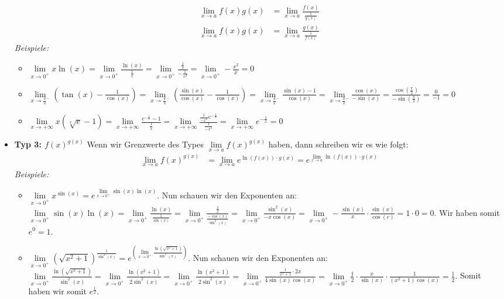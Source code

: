 \documentclass[25pt]{sciposter}
\newcommand{\limx}[1]{\lim\limits_{x \to #1}}
\begin{document}
\begin{multicols}{3}
\begin{itemize}
	\begin{align*}
	\lim_{x \to a}f(x) g(x) &= \lim_{x\to a} \frac{f(x)}{\frac{1}{g(x)}}\\
	\lim_{x \to a}f(x) g(x) &= \lim_{x\to a} \frac{g(x)}{\frac{1}{f(x)}}
	\end{align*}
	\textit{Beispiele:}
	\begin{itemize}
		\item $\limx{0^+} x\ln(x) = \limx{0^+} \frac{\ln(x)}{\frac{1}{x}} = \limx{0^+} \frac{\frac{1}{x}}{-\frac{1}{x^2}} = \limx{0^+} -\frac{x^2}{x} = 0$
		\item $\limx{\frac{\pi}{2}^-} \left( \tan(x) - \frac{1}{\cos(x)} \right) = \limx{\frac{\pi}{2}^-} \left(\frac{\sin(x)}{\cos(x)}- \frac{1}{\cos(x)} \right) = \limx{\frac{\pi}{2}^-} \frac{\sin(x) -1}{\cos(x)} = \limx{\frac{\pi}{2}^-} \frac{\cos(x)}{-\sin(x)} = \frac{\cos(\frac{\pi}{2})}{-\sin(\frac{\pi}{2})} = \frac{0}{-1} = 0$
		\item $\limx{+ \infty} x \left( \sqrt[x]{e} -1 \right) = \limx{+ \infty} \frac{e^{-\frac{1}{x}}-1}{\frac{1}{x}} = \limx{+ \infty} \frac{\frac{1}{-x^2}e^{-\frac{1}{x}}}{\frac{1}{-x^2}} = \limx{+ \infty} e^{-\frac{1}{x}} = 0$
	\end{itemize}
	
	
	\item \textbf{Typ 3: $f(x)^{g(x)}$} Wenn wir Grenzwerte des Types $ \limx{a} f(x)^{g(x)}$ haben, dann schreiben wir es wie folgt:
	\begin{align*}
	\limx{a} f(x)^{g(x)} &= \limx{a} e^{\ln(f(x))\cdot g(x)} = e^{\limx{a} \ln(f(x))\cdot g(x)}
	\end{align*}
	\textit{Beispiele:}
	\begin{itemize}
		\item $\limx{0^+} x^{\sin(x)} = e^{\limx{0^+} \sin(x)\ln(x)}$. Nun schauen wir den Exponenten an: $\limx{0^+} \sin(x)\ln(x) = \limx{0^+} \frac{\ln(x)}{\frac{1}{\sin(x)}} = \limx{0^+} \frac{\frac{1}{x}}{\frac{-\cos(x)}{\sin^2(x)}} = \limx{0^+} \frac{\sin^2(x)}{- x\cos(x)} = \limx{0^+} -\frac{\sin(x)}{x} \cdot\frac{\sin(x)}{\cos(c)} = 1 \cdot 0 = 0$. Wir haben somit $e^0 = 1$.
		\item $\limx{0^+} \left( \sqrt{x^2 + 1} \right)^{\frac{1}{\sin^2(x)}} = e^{\left(\limx{0^+} \frac{\ln(\sqrt{x^2 + 1})}{\sin^2(x)} \right)}$. Nun schauen wir den Exponenten an: $\limx{0^+} \frac{\ln(\sqrt{x^2 + 1})}{\sin^2(x)} = \limx{0^+} \frac{\ln(x^2 + 1)}{2\sin^2(x)} = \limx{0^+} \frac{\ln(x^2 + 1)}{2\sin^2(x)} = \limx{0^+} \frac{\frac{1}{x^2+1}\cdot 2x}{4\sin(x)\cos(x)} = \limx{0^+} \frac{1}{2}\cdot \frac{x}{\sin(x)} \cdot \frac{1}{(x^2 + 1) \cos(x)} = \frac{1}{2}$. Somit haben wir somit $e^{\frac{1}{2}}$.
	\end{itemize}
\end{itemize}


\end{multicols}
\end{document}
